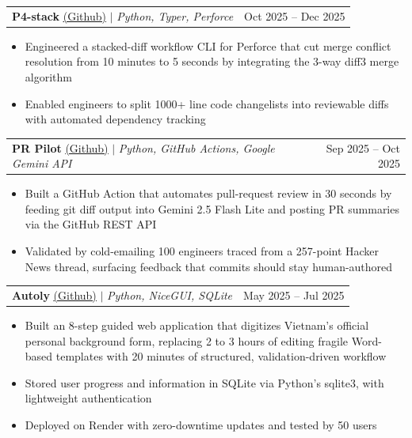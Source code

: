 \documentclass[letterpaper,11pt]{article}
\makeatletter
\newcommand{\resumeItem}[1]{
  \item\small{
    {#1 \vspace{-2pt}}
  }
}
\newcommand{\resumeProjectHeading}[2]{
    \item
    \begin{tabular*}{0.97\textwidth}{l@{\extracolsep{\fill}}r}
      \small#1 & #2 \\
    \end{tabular*}\vspace{-7pt}
}
\newcommand{\resumeItemListStart}{\begin{itemize}}
\newcommand{\resumeItemListEnd}{\end{itemize}\vspace{-5pt}}
\makeatother
\begin{document}
    \resumeProjectHeading
      {\textbf{P4-stack} \href{https://github.com/minhkhoango/p4-stack}{\underline{(Github)}} $|$ \emph{Python, Typer, Perforce}}{Oct 2025 -- Dec 2025}
      \resumeItemListStart
        \resumeItem{Engineered a stacked-diff workflow CLI for Perforce that cut merge conflict resolution from 10 minutes to 5 seconds by integrating the 3-way diff3 merge algorithm}
        \resumeItem{Enabled engineers to split 1000+ line code changelists into reviewable diffs with automated dependency tracking}
      \resumeItemListEnd

    \resumeProjectHeading
      {\textbf{PR Pilot} \href{https://github.com/minhkhoango/pr-pilot}{\underline{(Github)}} $|$ \emph{Python, GitHub Actions, Google Gemini API}}{Sep 2025 -- Oct 2025}
      \resumeItemListStart
        \resumeItem{Built a GitHub Action that automates pull-request review in 30 seconds by feeding git diff output into Gemini 2.5 Flash Lite and posting PR summaries via the GitHub REST API}
        \resumeItem{Validated by cold-emailing 100 engineers traced from a 257-point Hacker News thread, surfacing feedback that commits should stay human-authored}
      \resumeItemListEnd

    \resumeProjectHeading
      {\textbf{Autoly} \href{https://github.com/minhkhoango/AutoLy}{\underline{(Github)}} $|$ \emph{Python, NiceGUI, SQLite}}{May 2025 -- Jul 2025}
      \resumeItemListStart
        \resumeItem{Built an 8-step guided web application that digitizes Vietnam's official personal background form, replacing 2 to 3 hours of editing fragile Word-based templates with 20 minutes of structured, validation-driven workflow}
        \resumeItem{Stored user progress and information in SQLite via Python's sqlite3, with lightweight authentication}
        \resumeItem{Deployed on Render with zero-downtime updates and tested by 50 users}
      \resumeItemListEnd
\end{document}
